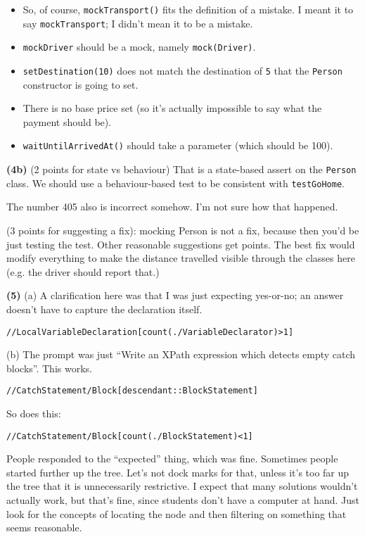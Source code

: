 \documentclass[11pt,onecolumn,letterpaper]{article}
\newcounter{qNum}
\newcommand{\q}[1]{%
\textbf{(#1)}\stepcounter{qNum}}
\begin{document}
\begin{itemize}[noitemsep]
\item So, of course, {\tt mockTransport()} fits the definition of a mistake. I meant it to say
{\tt mockTransport}; I didn't mean it to be a mistake.

\item {\tt mockDriver} should be a mock, namely {\tt mock(Driver)}.
\item {\tt setDestination(10)} does not match the destination of {\tt 5} that the {\tt Person} constructor
  is going to set.
\item There is no base price set (so it's actually impossible to say what the payment should be).
\item {\tt waitUntilArrivedAt()} should take a parameter (which should be 100).
\end{itemize}

\q{4b} (2 points for state vs behaviour) That is a state-based assert on the {\tt Person} class. We should use a behaviour-based test to be consistent
with {\tt testGoHome}.

The number 405 also is incorrect somehow. I'm not sure how that happened. 


(3 points for suggesting a fix): mocking Person is not a fix, because then you'd be just testing the test.
Other reasonable suggestions get points. The best fix would modify everything to make the distance travelled
visible through the classes here (e.g. the driver should report that.)

\q{5} (a) A clarification here was that I was just expecting yes-or-no; an answer doesn't have to capture
the declaration itself.

\begin{verbatim}
//LocalVariableDeclaration[count(./VariableDeclarator)>1]
\end{verbatim}

(b) The prompt was just ``Write an XPath expression which detects empty catch blocks''.
This works.
\begin{verbatim}
//CatchStatement/Block[descendant::BlockStatement]
\end{verbatim}
So does this:
\begin{verbatim}
//CatchStatement/Block[count(./BlockStatement)<1]
\end{verbatim}

People responded to the ``expected'' thing, which was fine. Sometimes people started
further up the tree. Let's not dock marks for that, unless it's too far up the tree that
it is unnecessarily restrictive. I expect that many solutions wouldn't actually work, but that's
fine, since students don't have a computer at hand. Just look for the concepts of locating the node and
then filtering on something that seems reasonable.
\end{document}
